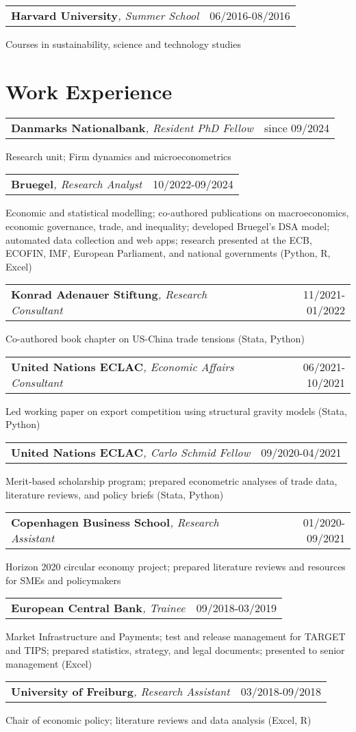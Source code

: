 \documentclass[A4,11pt]{article}
\makeatletter
\newcommand{\Subheading}[4]{   
    \begin{tabular*}{\textwidth}[t]{@{}l @{\extracolsep{\fill}} r@{}}
        \textbf{#1}\textit{\small #2} & {\footnotesize #3} \\
    \end{tabular*}
    {\small #4}
    \vspace{7pt}
}
\makeatother
\begin{document}
    \Subheading
        {Harvard University}{, Summer School}{06/2016-08/2016}
        {Courses in sustainability, science and technology studies}

\section{Work Experience}

    \Subheading
        {Danmarks Nationalbank}{, Resident PhD Fellow}{since 09/2024}
        {Research unit; Firm dynamics and microeconometrics}

    \Subheading
        {Bruegel}{, Research Analyst}{10/2022-09/2024}
        {Economic and statistical modelling; co-authored publications on macroeconomics, 
        economic governance, trade, and inequality; 
        developed Bruegel's DSA model; 
        automated data collection and web apps;
        research presented at the ECB, ECOFIN, IMF, European Parliament, and national governments 
        (Python, R, Excel)}

    \Subheading
        {Konrad Adenauer Stiftung}{, Research Consultant}{11/2021-01/2022}
        {Co-authored book chapter on US-China trade tensions 
        (Stata, Python)}  

    \Subheading
        {United Nations ECLAC}{, Economic Affairs Consultant}{06/2021-10/2021}
        {Led working paper on export competition using structural gravity models (Stata, Python)}

    \Subheading
        {United Nations ECLAC}{, Carlo Schmid Fellow}{09/2020-04/2021}
        {Merit-based scholarship program; prepared econometric analyses of trade data, 
        literature reviews, and policy briefs (Stata, Python)}

    \Subheading
        {Copenhagen Business School}{, Research Assistant}{01/2020-09/2021}
        {Horizon 2020 circular economy project; prepared literature reviews and 
        resources for SMEs and policymakers}

    \Subheading
        {European Central Bank}{, Trainee}{09/2018-03/2019}
        {Market Infrastructure and Payments; test and release management for TARGET 
        and TIPS; prepared statistics, strategy, and legal documents;
        presented to senior management (Excel)}

    \Subheading
        {University of Freiburg}{, Research Assistant}{03/2018-09/2018}
        {Chair of economic policy; literature reviews and data analysis (Excel, R)}
\end{document}
